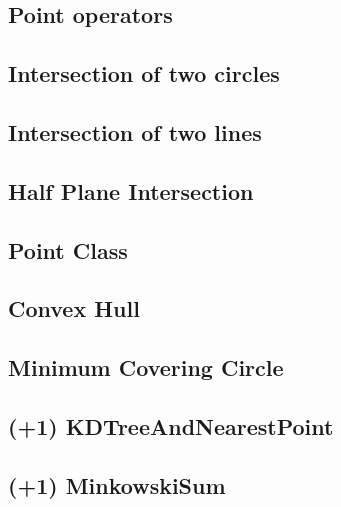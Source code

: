 \documentclass[10pt,twocolumn,oneside]{article}
\begin{document}
\subsection{Point operators}


\subsection{Intersection of two circles}


\subsection{Intersection of two lines}


\subsection{Half Plane Intersection}


\subsection{Point Class}


\subsection{Convex Hull}


\subsection{Minimum Covering Circle}


\subsection{(+1) KDTreeAndNearestPoint}


\subsection{(+1) MinkowskiSum}

\end{document}

